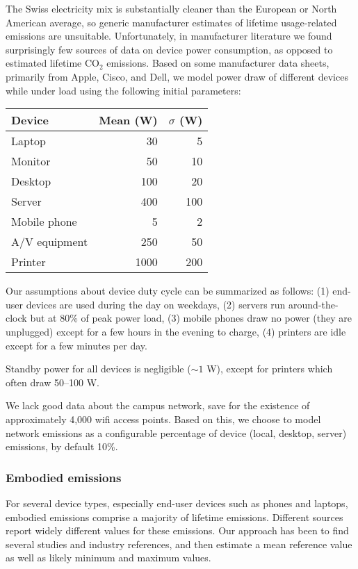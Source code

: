 \documentclass[11pt]{article}
\begin{document}
The Swiss electricity mix is substantially cleaner than the European or North American average, so generic manufacturer estimates of lifetime usage-related emissions are unsuitable. Unfortunately, in manufacturer literature we found surprisingly few sources of data on device power consumption, as opposed to estimated lifetime CO$_2$ emissions. Based on some manufacturer data sheets, primarily from Apple, Cisco, and Dell, we model power draw of different devices while under load using the following initial parameters:

\begin{center}
\begin{tabular}{|l|r|r|}
\hline
\textbf{Device} & \textbf{Mean (W)} & \textbf{$\sigma$ (W)} \\ \hline
Laptop & 30 & 5 \\ \hline
Monitor & 50 & 10 \\ \hline
Desktop & 100 & 20 \\ \hline
Server & 400 & 100 \\ \hline
Mobile phone & 5 & 2 \\ \hline
A/V equipment & 250 & 50 \\ \hline
Printer & 1000 & 200 \\ \hline
\end{tabular}
\end{center}

Our assumptions about device duty cycle can be summarized as follows: (1) end-user devices are used during the day on weekdays, (2) servers run around-the-clock but at 80\% of peak power load, (3) mobile phones draw no power (they are unplugged) except for a few hours in the evening to charge, (4) printers are idle except for a few minutes per day.

Standby power for all devices is negligible ($\sim 1$ W), except for printers which often draw 50--100 W.

We lack good data about the campus network, save for the existence of approximately 4,000 wifi access points. Based on this, we choose to model network emissions as a configurable percentage of device (local, desktop, server) emissions, by default 10\%.

\subsubsection*{Embodied emissions}

For several device types, especially end-user devices such as phones and laptops, embodied emissions
comprise a majority of lifetime emissions. Different sources report widely different values for these emissions. Our approach has been to find several studies and industry references, and then estimate a mean reference value as well as likely minimum and maximum values.
\end{document}
